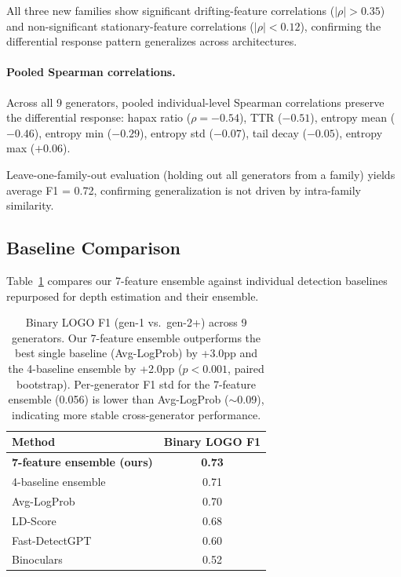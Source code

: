 \documentclass[11pt,a4paper]{article}
\begin{document}
All three new families show significant drifting-feature correlations ($|\rho| > 0.35$) and non-significant stationary-feature correlations ($|\rho| < 0.12$), confirming the differential response pattern generalizes across architectures.

\paragraph{Pooled Spearman correlations.}
Across all 9 generators, pooled individual-level Spearman correlations preserve the differential response: hapax ratio ($\rho = -0.54$), TTR ($-0.51$), entropy mean ($-0.46$), entropy min ($-0.29$), entropy std ($-0.07$), tail decay ($-0.05$), entropy max ($+0.06$).

Leave-one-family-out evaluation (holding out all generators from a family) yields average F1 = 0.72, confirming generalization is not driven by intra-family similarity.

\subsection{Baseline Comparison}
\label{sec:baselines}

Table~\ref{tab:baselines} compares our 7-feature ensemble against individual detection baselines repurposed for depth estimation and their ensemble.

\begin{table}[t]
\centering
\small
\begin{tabular}{lc}
\toprule
\textbf{Method} & \textbf{Binary LOGO F1} \\
\midrule
\textbf{7-feature ensemble (ours)} & \textbf{0.73} \\
4-baseline ensemble          & 0.71 \\
Avg-LogProb                  & 0.70 \\
LD-Score                     & 0.68 \\
Fast-DetectGPT               & 0.60 \\
Binoculars                   & 0.52 \\
\bottomrule
\end{tabular}
\caption{Binary LOGO F1 (gen-1 vs.\ gen-2+) across 9 generators. Our 7-feature ensemble outperforms the best single baseline (Avg-LogProb) by +3.0pp and the 4-baseline ensemble by +2.0pp ($p < 0.001$, paired bootstrap). Per-generator F1 std for the 7-feature ensemble (0.056) is lower than Avg-LogProb (${\sim}$0.09), indicating more stable cross-generator performance.}
\label{tab:baselines}
\end{table}
\end{document}
